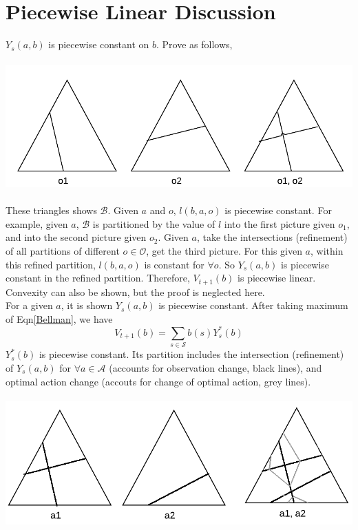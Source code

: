 \documentclass[a4paper,onecolumn]{article}
\begin{document}
\section{Piecewise Linear Discussion}
$Y_s(a,b)$ is piecewise constant on $b$. Prove as follows,
\begin{center}
    \includegraphics[height=5cm]{partition.png}
\end{center}
These triangles shows $\mathcal{B}$.
Given $a$ and $o$, $l(b,a,o)$ is piecewise constant. For example, given
$a$, $\mathcal{B}$ is partitioned by the value of $l$ into the first
picture given $o_1$, and into the second picture given $o_2$. Given $a$, take the
intersections (refinement) of all partitions of different
$o\in\mathcal{O}$, get the third picture. For this given $a$, within this refined partition,
$l(b,a,o)$ is constant for $\forall o$. So $Y_s(a,b)$ is
piecewise constant in the refined partition. Therefore, $V_{t+1}(b)$ is
piecewise linear. Convexity can also be shown, but the proof is
neglected here.\\

\noindent For a given $a$, it is shown $Y_s(a,b)$ is piecewise constant.
After taking maximum of Eqn\eqref{Bellman}, we have
\begin{equation}
    V_{t+1}(b) = \sum_{s\in\mathcal{S}}b(s) Y^*_s(b)
\end{equation}
$Y^*_s(b)$ is piecewise constant. Its partition includes the intersection
(refinement) of $Y_s(a,b)$ for $\forall a\in \mathcal{A}$ (accounts for
observation change, black lines), and optimal action change (accouts for
change of optimal action, grey lines).
\begin{center}
    \includegraphics[height=5cm]{partition_a.png}
\end{center}
\end{document}
